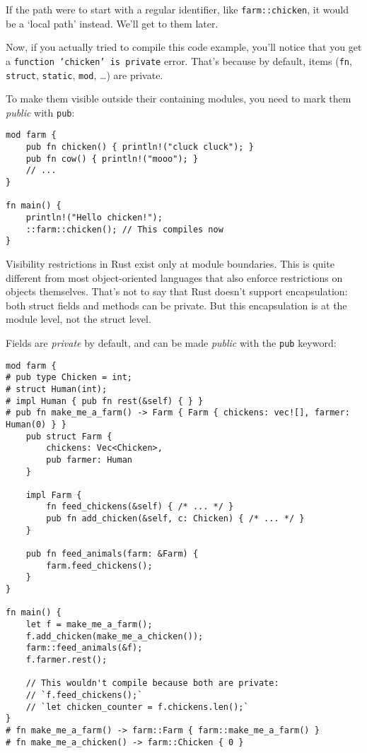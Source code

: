 \documentclass[]{article}
\begin{document}
If the path were to start with a regular identifier, like
\texttt{farm::chicken}, it would be a `local path' instead. We'll get to
them later.

Now, if you actually tried to compile this code example, you'll notice
that you get a \texttt{function 'chicken' is private} error. That's
because by default, items (\texttt{fn}, \texttt{struct},
\texttt{static}, \texttt{mod}, \ldots{}) are private.

To make them visible outside their containing modules, you need to mark
them \emph{public} with \texttt{pub}:

\begin{verbatim}
mod farm {
    pub fn chicken() { println!("cluck cluck"); }
    pub fn cow() { println!("mooo"); }
    // ...
}

fn main() {
    println!("Hello chicken!");
    ::farm::chicken(); // This compiles now
}
\end{verbatim}

Visibility restrictions in Rust exist only at module boundaries. This is
quite different from most object-oriented languages that also enforce
restrictions on objects themselves. That's not to say that Rust doesn't
support encapsulation: both struct fields and methods can be private.
But this encapsulation is at the module level, not the struct level.

Fields are \emph{private} by default, and can be made \emph{public} with
the \texttt{pub} keyword:

\begin{verbatim}
mod farm {
# pub type Chicken = int;
# struct Human(int);
# impl Human { pub fn rest(&self) { } }
# pub fn make_me_a_farm() -> Farm { Farm { chickens: vec![], farmer: Human(0) } }
    pub struct Farm {
        chickens: Vec<Chicken>,
        pub farmer: Human
    }

    impl Farm {
        fn feed_chickens(&self) { /* ... */ }
        pub fn add_chicken(&self, c: Chicken) { /* ... */ }
    }

    pub fn feed_animals(farm: &Farm) {
        farm.feed_chickens();
    }
}

fn main() {
    let f = make_me_a_farm();
    f.add_chicken(make_me_a_chicken());
    farm::feed_animals(&f);
    f.farmer.rest();

    // This wouldn't compile because both are private:
    // `f.feed_chickens();`
    // `let chicken_counter = f.chickens.len();`
}
# fn make_me_a_farm() -> farm::Farm { farm::make_me_a_farm() }
# fn make_me_a_chicken() -> farm::Chicken { 0 }
\end{verbatim}
\end{document}
